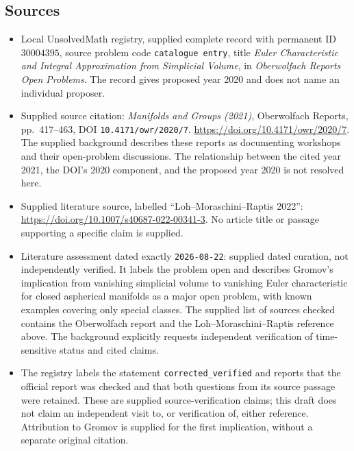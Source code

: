 \documentclass[11pt]{article}
\begin{document}
\subsection{Sources}
\begin{itemize}
\item Local UnsolvedMath registry, supplied complete record with permanent ID \(30004395\), source problem code \texttt{catalogue entry}, title \emph{Euler Characteristic and Integral Approximation from Simplicial Volume}, in \emph{Oberwolfach Reports Open Problems}. The record gives proposed year 2020 and does not name an individual proposer.
\item Supplied source citation: \emph{Manifolds and Groups (2021)}, Oberwolfach Reports, pp.~417--463, DOI \texttt{10.4171/owr/2020/7}. \url{https://doi.org/10.4171/owr/2020/7}. The supplied background describes these reports as documenting workshops and their open-problem discussions. The relationship between the cited year 2021, the DOI's 2020 component, and the proposed year 2020 is not resolved here.
\item Supplied literature source, labelled ``Loh--Moraschini--Raptis 2022'': \url{https://doi.org/10.1007/s40687-022-00341-3}. No article title or passage supporting a specific claim is supplied.
\item Literature assessment dated exactly \texttt{2026-08-22}: supplied dated curation, not independently verified. It labels the problem open and describes Gromov's implication from vanishing simplicial volume to vanishing Euler characteristic for closed aspherical manifolds as a major open problem, with known examples covering only special classes. The supplied list of sources checked contains the Oberwolfach report and the Loh--Moraschini--Raptis reference above. The background explicitly requests independent verification of time-sensitive status and cited claims.
\item The registry labels the statement \texttt{corrected\_verified} and reports that the official report was checked and that both questions from its source passage were retained. These are supplied source-verification claims; this draft does not claim an independent visit to, or verification of, either reference. Attribution to Gromov is supplied for the first implication, without a separate original citation.
\end{itemize}
\end{document}
